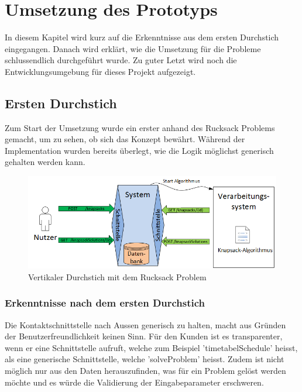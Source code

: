 %
%

\chapter{Umsetzung des Prototyps \resultAssignment{[R5]}}\label{chap.umsetzung}
In diesem Kapitel wird kurz auf die Erkenntnisse aus dem ersten Durchstich eingegangen. Danach wird erklärt, wie die Umsetzung für die Probleme schlussendlich durchgeführt wurde. Zu guter 
Letzt wird noch die Entwicklungsumgebung für dieses Projekt aufgezeigt.

\section{Ersten Durchstich}\label{entwicklungsumgebung}
Zum Start der Umsetzung wurde ein erster  anhand des Rucksack Problems gemacht, um zu sehen, ob sich das Konzept bewährt. Während der 
Implementation wurden bereits überlegt, wie die Logik möglichst generisch gehalten werden kann.

\begin{figure}[h]
\centering
\includegraphics[scale=0.8]{images/visio/prototype_knapsack.png}
\caption[Vertikaler Durchstich mit dem Rucksack Problem]{Vertikaler Durchstich mit dem Rucksack Problem \selfmade{}}
\label{fig:architektur}
\end{figure}

\subsection{Erkenntnisse nach dem ersten Durchstich}\label{entwicklungsumgebung}
Die Kontaktschnittstelle nach Aussen generisch zu halten, macht aus Gründen der Benutzerfreundlichkeit keinen Sinn. Für den Kunden ist es transparenter, wenn er eine Schnittstelle aufruft, 
welche zum Beispiel 'timetabelSchedule' heisst, als eine generische Schnittstelle, welche 'solveProblem' heisst. Zudem ist nicht möglich nur aus den Daten herauszufinden, was für ein Problem 
gelöst werden möchte und es würde die Validierung der Eingabeparameter erschweren.\\

